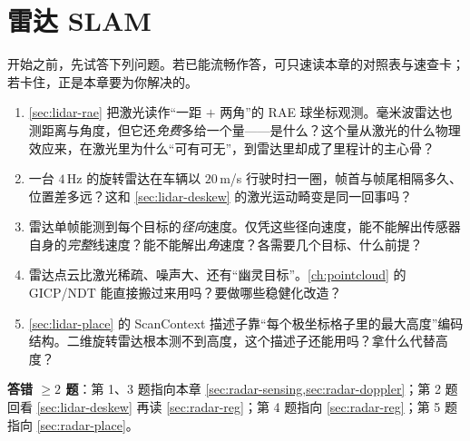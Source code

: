 \chapter{雷达 SLAM}
\label{ch:radar}


\begin{practice}[前置自测]
开始之前，先试答下列问题。若已能流畅作答，可只速读本章的对照表与速查卡；若卡住，正是本章要为你解决的。
\begin{enumerate}
  \item \cref{sec:lidar-rae} 把激光读作“一距 $+$ 两角”的 RAE 球坐标观测。毫米波雷达也测距离与角度，但它还\emph{免费}多给一个量——是什么？这个量从激光的什么物理效应来，在激光里为什么“可有可无”，到雷达里却成了里程计的主心骨？
  \item 一台 $4$\,Hz 的旋转雷达在车辆以 $20$\,m/s 行驶时扫一圈，帧首与帧尾相隔多久、位置差多远？这和 \cref{sec:lidar-deskew} 的激光运动畸变是同一回事吗？
  \item 雷达单帧能测到每个目标的\emph{径向}速度。仅凭这些径向速度，能不能解出传感器自身的\emph{完整}线速度？能不能解出\emph{角}速度？各需要几个目标、什么前提？
  \item 雷达点云比激光稀疏、噪声大、还有“幽灵目标”。\cref{ch:pointcloud} 的 GICP/NDT 能直接搬过来用吗？要做哪些稳健化改造？
  \item \cref{sec:lidar-place} 的 ScanContext 描述子靠“每个极坐标格子里的最大高度”编码结构。二维旋转雷达根本测不到高度，这个描述子还能用吗？拿什么代替高度？
\end{enumerate}
\textbf{答错 $\ge2$ 题}：第 1、3 题指向本章 \cref{sec:radar-sensing,sec:radar-doppler}；第 2 题回看 \cref{sec:lidar-deskew} 再读 \cref{sec:radar-reg}；第 4 题指向 \cref{sec:radar-reg}；第 5 题指向 \cref{sec:radar-place}。
\end{practice}

